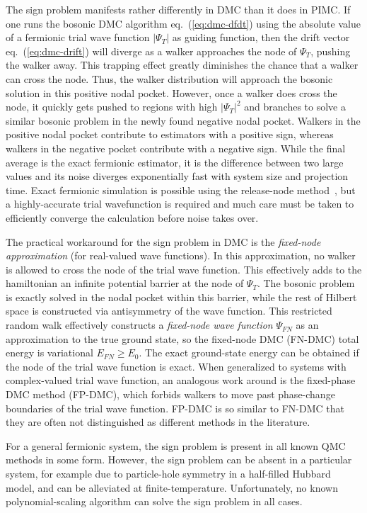 The sign problem manifests rather differently in DMC than it does in PIMC.
If one runs the bosonic DMC algorithm eq.~(\ref{eq:dmc-dfdt}) using the absolute value of a fermionic trial wave function $\vert\Psi_T\vert$ as guiding function, then the drift vector eq.~(\ref{eq:dmc-drift}) will diverge as a walker approaches the node of $\Psi_T$, pushing the walker away.
This trapping effect greatly diminishes the chance that a walker can cross the node.
Thus, the walker distribution will approach the bosonic solution in this positive nodal pocket.
However, once a walker does cross the node, it quickly gets pushed to regions with high $\vert\Psi_T\vert^2$ and branches to solve a similar bosonic problem in the newly found negative nodal pocket.
Walkers in the positive nodal pocket contribute to estimators with a positive sign, whereas walkers in the negative pocket contribute with a negative sign.
While the final average is the exact fermionic estimator, it is the difference between two large values and its noise diverges exponentially fast with system size and projection time.
Exact fermionic simulation is possible using the release-node method~\cite{Ceperley1978}, but a highly-accurate trial wavefunction is required and much care must be taken to efficiently converge the calculation before noise takes over.

The practical workaround for the sign problem in DMC is the \textit{fixed-node approximation} (for real-valued wave functions).
In this approximation, no walker is allowed to cross the node of the trial wave function.
This effectively adds to the hamiltonian an infinite potential barrier at the node of $\Psi_T$.
The bosonic problem is exactly solved in the nodal pocket within this barrier, while the rest of Hilbert space is constructed via antisymmetry of the wave function.
This restricted random walk effectively constructs a \emph{fixed-node wave function} $\Psi_{FN}$ as an approximation to the true ground state, so the fixed-node DMC (FN-DMC) total energy is variational $E_{FN}\ge E_0$.
The exact ground-state energy can be obtained if the node of the trial wave function is exact.
When generalized to systems with complex-valued trial wave function, an analogous work around is the fixed-phase DMC method (FP-DMC), which forbids walkers to move past phase-change boundaries of the trial wave function.
FP-DMC is so similar to FN-DMC that they are often not distinguished as different methods in the literature.

For a general fermionic system, the sign problem is present in all known QMC methods in some form.
However, the sign problem can be absent in a particular system, for example due to particle-hole symmetry in a half-filled Hubbard model, and can be alleviated at finite-temperature.
Unfortunately, no known polynomial-scaling algorithm can solve the sign problem in all cases.